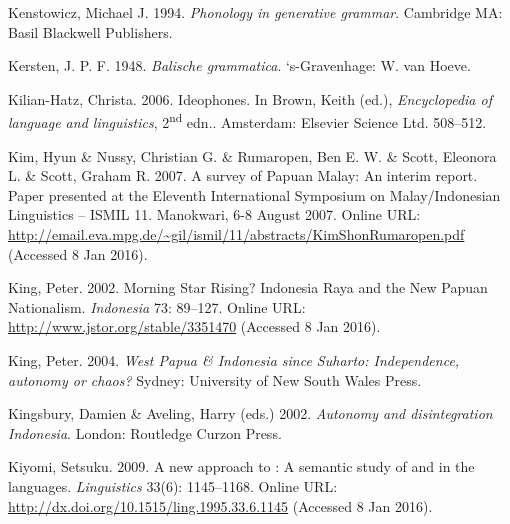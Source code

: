 \begin{styleCitaviBibliographyEntry}
Kenstowicz, Michael J. 1994. \textit{Phonology in generative grammar}. Cambridge MA: Basil Blackwell Publishers.
\end{styleCitaviBibliographyEntry}

\begin{styleCitaviBibliographyEntry}
Kersten, J. P. F. 1948. \textit{Balische grammatica}. ‘s-Gravenhage: W. van Hoeve.
\end{styleCitaviBibliographyEntry}

\begin{styleCitaviBibliographyEntry}
Kilian-Hatz, Christa. 2006. Ideophones. In Brown, Keith (ed.), \textit{Encyclopedia of language and linguistics}, 2\textsuperscript{nd} edn.. Amsterdam: Elsevier Science Ltd. 508–512.
\end{styleCitaviBibliographyEntry}

\begin{styleCitaviBibliographyEntry}
Kim, Hyun \& Nussy, Christian G. \& Rumaropen, Ben E. W. \& Scott, Eleonora L. \& Scott, Graham R. 2007. A survey of Papuan Malay: An interim report. Paper presented at the Eleventh International Symposium on Malay/Indonesian Linguistics – ISMIL 11. Manokwari, 6-8 August 2007. Online URL: \url{http://email.eva.mpg.de/~gil/ismil/11/abstracts/KimShonRumaropen.pdf} (Accessed 8 Jan 2016).
\end{styleCitaviBibliographyEntry}

\begin{styleCitaviBibliographyEntry}
King, Peter. 2002. Morning Star Rising? Indonesia Raya and the New Papuan Nationalism. \textit{Indonesia} 73: 89–127. Online URL: \url{http://www.jstor.org/stable/3351470} (Accessed 8 Jan 2016).
\end{styleCitaviBibliographyEntry}

\begin{styleCitaviBibliographyEntry}
King, Peter. 2004. \textit{West Papua \& Indonesia since Suharto: Independence, autonomy or chaos? }Sydney: University of New South Wales Press.
\end{styleCitaviBibliographyEntry}

\begin{styleCitaviBibliographyEntry}
Kingsbury, Damien \& Aveling, Harry (eds.) 2002. \textit{Autonomy and disintegration Indonesia}. London: Routledge Curzon Press.
\end{styleCitaviBibliographyEntry}

\begin{styleCitaviBibliographyEntry}
Kiyomi, Setsuku. 2009. A new approach to : A semantic study of  and   in the  languages. \textit{Linguistics} 33(6): 1145–1168. Online URL: \url{http://dx.doi.org/10.1515/ling.1995.33.6.1145} (Accessed 8 Jan 2016).
\end{styleCitaviBibliographyEntry}

